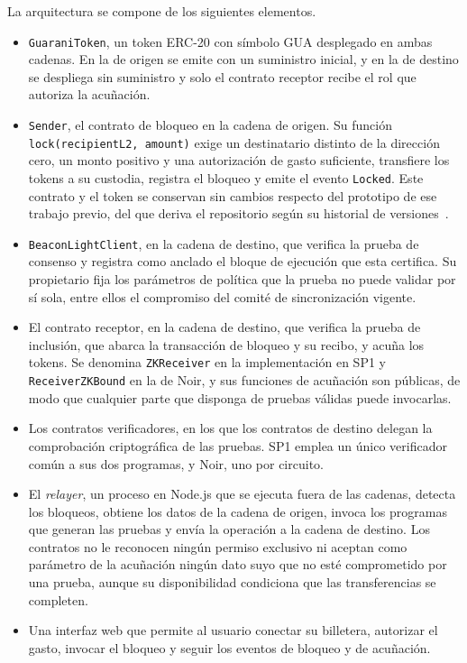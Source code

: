 La arquitectura se compone de los siguientes elementos.
\begin{itemize}
	\item \texttt{GuaraniToken}, un token ERC-20 con símbolo GUA desplegado en ambas cadenas. En la
	de origen se emite con un suministro inicial, y en la de destino se despliega sin suministro y
	solo el contrato receptor recibe el rol que autoriza la acuñación.
	\item \texttt{Sender}, el contrato de bloqueo en la cadena de origen. Su función
	\lstinline[breaklines=true]|lock(recipientL2, amount)| exige un destinatario distinto de la dirección cero, un
	monto positivo y una autorización de gasto suficiente, transfiere los tokens a su custodia,
	registra el bloqueo y emite el evento \texttt{Locked}. Este contrato y el token se conservan
	sin cambios respecto del prototipo de ese trabajo previo, del que deriva el repositorio
	según su historial de versiones~\cite{figueredo2026zkbridge, zkguaranibridgesp1}.
	\item \texttt{BeaconLightClient}, en la cadena de destino, que verifica la prueba de consenso y
	registra como anclado el bloque de ejecución que esta certifica. Su propietario fija los
	parámetros de política que la prueba no puede validar por sí sola, entre ellos el compromiso del
	comité de sincronización vigente.
	\item El contrato receptor, en la cadena de destino, que verifica la prueba de inclusión, que
	abarca la transacción de bloqueo y su recibo, y acuña los tokens. Se denomina
	\texttt{ZKReceiver} en la implementación en SP1 y \texttt{ReceiverZKBound} en la de Noir, y sus
	funciones de acuñación son públicas, de modo que cualquier parte que disponga de pruebas válidas
	puede invocarlas.
	\item Los contratos verificadores, en los que los contratos de destino delegan la comprobación
	criptográfica de las pruebas. SP1 emplea un único verificador común a sus dos programas, y Noir,
	uno por circuito.
	\item El \textit{relayer}, un proceso en Node.js que se ejecuta fuera de las cadenas, detecta los
	bloqueos, obtiene los datos de la cadena de origen, invoca los programas que generan las pruebas
	y envía la operación a la cadena de destino. Los contratos no le reconocen ningún permiso
	exclusivo ni aceptan como parámetro de la acuñación ningún dato suyo que no esté comprometido
	por una prueba, aunque su disponibilidad condiciona que las transferencias se completen.
	\item Una interfaz web que permite al usuario conectar su billetera, autorizar el gasto, invocar
	el bloqueo y seguir los eventos de bloqueo y de acuñación.
\end{itemize}


